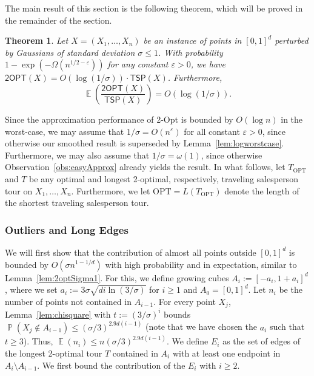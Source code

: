 \documentclass[11pt,DIV=12,a4paper]{scrartcl}
\newtheorem{theorem}[claim]{Theorem}
\DeclareMathOperator{\probab}{\mathbb{P}}
\DeclareMathOperator{\expected}{\mathbb{E}}
\newcommand{\obsref}[1]{Observation~\ref{obs:#1}}
\newcommand{\TSP}{\mathsf{TSP}}
\newcommand{\TwoOPT}{\mathsf{2OPT}}
\newcommand{\OPT}{\mathrm{OPT}}
\begin{document}
The main result of this section is the following theorem, which will be proved in the remainder of the section.

\begin{theorem}\label{thm:upper}
Let $X=(X_1,\dots,X_n)$ be an instance of points in $[0,1]^d$ perturbed by Gaussians of standard deviation $\sigma \le 1$.  With probability $1-\exp(-\Omega(n^{1/2-\varepsilon}))$ for any constant $\varepsilon > 0$, we have $\TwoOPT(X) = O(\log(1/\sigma)) \cdot \TSP(X)$.
Furthermore,
\[\expected\left(\frac{\TwoOPT(X)}{\TSP(X)}\right) = O(\log(1/\sigma)).
\]
\end{theorem}

Since the approximation performance of 2-Opt is bounded by $O(\log n)$ in the worst-case, we may assume that $1/\sigma = O(n^\varepsilon)$ for all constant $\varepsilon>0$, since otherwise our smoothed result is superseded by Lemma~\ref{lem:logworstcase}. Furthermore, we may also assume that $1/\sigma = \omega(1)$, since otherwise \obsref{easyApprox} already yields the result. In what follows, let $T_\OPT$ and $T$ be any optimal and longest 2-optimal, respectively, traveling salesperson tour on $X_1,\dots,X_n$. Furthermore, we let $\OPT = L(T_\OPT)$ denote the length of the shortest traveling salesperson tour.


\subsubsection{Outliers and Long Edges}

We will first show that the contribution of almost all points outside $[0,1]^d$ is bounded by $O(\sigma n^{1-1/d})$ with high probability and in expectation, similar to Lemma~\ref{lem:2optSigma1}. For this, we define growing cubes $A_i := [-a_i, 1+a_i]^d$, where we set $a_i := 3\sigma \sqrt{di\ln(3/\sigma)}$ for $i\ge 1$ and $A_0 = [0,1]^d$. Let $n_i$ be the number of points not contained in $A_{i-1}$. For every point $X_j$, Lemma~\ref{lem:chisquare} with $t:=(3/\sigma)^i$ bounds $\probab(X_j \notin A_{i-1}) \le (\sigma/3)^{2.9d(i-1)}$ (note that we have chosen the $a_i$ such that $t\ge 3$).
Thus, $\expected(n_i)\le n(\sigma/3)^{2.9d(i-1)}$. 
We define $E_i$ as the set of edges of the longest 2-optimal tour $T$ contained in $A_i$ with at least one endpoint in $A_i\setminus A_{i-1}$. We first bound the contribution of the $E_i$ with $i\ge 2$. 
\end{document}
